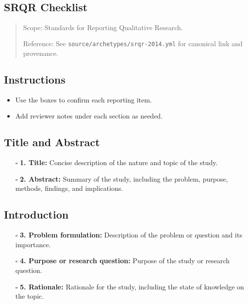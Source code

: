 \documentclass[11pt]{article}
\def\tightlist{}
\begin{document}
\begin{center}
{\LARGE }\\[4pt]
\normalsize 
\end{center}
\vspace{1em}

\begin{Form}

\section{SRQR Checklist}\label{srqr-checklist}

\begin{quote}
Scope: Standards for Reporting Qualitative Research.

Reference: See \texttt{source/archetypes/srqr-2014.yml} for canonical
link and provenance.
\end{quote}

\subsection{Instructions}\label{instructions}

\begin{itemize}
\tightlist
\item
  Use the boxes to confirm each reporting item.
\item
  Add reviewer notes under each section as needed.
\end{itemize}

\subsection{Title and Abstract}\label{title-and-abstract}

\begin{itemize}
\tightlist
\item[$\square$]
  \textbf{1. Title:} Concise description of the nature and topic of the
  study.
\item[$\square$]
  \textbf{2. Abstract:} Summary of the study, including the problem,
  purpose, methods, findings, and implications.
\end{itemize}

\subsection{Introduction}\label{introduction}

\begin{itemize}
\tightlist
\item[$\square$]
  \textbf{3. Problem formulation:} Description of the problem or
  question and its importance.
\item[$\square$]
  \textbf{4. Purpose or research question:} Purpose of the study or
  research question.
\item[$\square$]
  \textbf{5. Rationale:} Rationale for the study, including the state of
  knowledge on the topic.
\end{itemize}


\end{Form}
\end{document}
